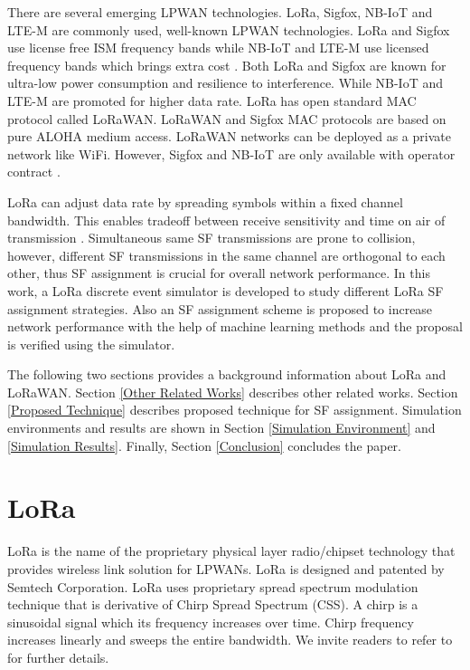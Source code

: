 \documentclass[conference]{IEEEtran}
\begin{document}
\par There are several emerging LPWAN technologies. LoRa, Sigfox, NB-IoT and LTE-M are commonly used, well-known LPWAN technologies. LoRa and Sigfox use license free ISM frequency bands while NB-IoT and LTE-M use licensed frequency bands which brings extra cost \cite{7815384}. Both LoRa and Sigfox are known for ultra-low power consumption and resilience to interference. While NB-IoT and LTE-M are promoted for higher data rate. LoRa has open standard MAC protocol called LoRaWAN. LoRaWAN and Sigfox MAC protocols are based on pure ALOHA medium access. LoRaWAN networks can be deployed as a private network like WiFi. However, Sigfox and NB-IoT are only available with operator contract \cite{7815384}.

\par LoRa can adjust data rate by spreading symbols within a fixed channel bandwidth. This enables tradeoff between receive sensitivity and time on air of transmission \cite{7803607}. Simultaneous same SF transmissions are prone to collision, however, different SF transmissions in the same channel are orthogonal to each other, thus SF assignment is crucial for overall network performance. In this work, a LoRa discrete event simulator is developed to study different LoRa SF assignment strategies. Also an SF assignment scheme is proposed to increase network performance with the help of machine learning methods and the proposal is verified using the simulator.

\par The following two sections provides a background information about LoRa and LoRaWAN. Section \ref{Other Related Works} describes other related works. Section \ref{Proposed Technique} describes proposed technique for SF assignment. Simulation environments and results are shown in Section \ref{Simulation Environment} and \ref{Simulation Results}. Finally, Section \ref{Conclusion} concludes the paper.


\section{LoRa}
\par LoRa is the name of the proprietary physical layer radio/chipset technology that provides wireless link solution for LPWANs. LoRa is designed and patented by Semtech Corporation. LoRa uses proprietary spread spectrum modulation technique that is derivative of Chirp Spread Spectrum (CSS). A chirp is a sinusoidal signal which its frequency increases over time. Chirp frequency increases linearly and sweeps the entire bandwidth. We invite readers to refer to \cite{AN1200.22} for further details.
\end{document}
